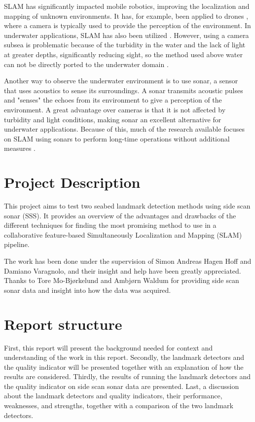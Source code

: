 SLAM has significantly impacted mobile robotics, improving the localization and mapping of unknown environments. It has, for example, been applied to drones \cite{VonStumberg2017FromExploration}, where a camera is typically used to provide the perception of the environment. In underwater applications, SLAM has also been utilized \cite{Hidalgo2015ReviewTechniques}. However, using a camera subsea is problematic because of the turbidity in the water and the lack of light at greater depths, significantly reducing sight, so the method used above water can not be directly ported to the underwater domain \cite{Paull2015Communication-constrainedSLAM}.  

Another way to observe the underwater environment is to use sonar, a sensor that uses acoustics to sense its surroundings. A sonar transmits acoustic pulses and "senses" the echoes from its environment to give a perception of the environment. A great advantage over cameras is that it is not affected by turbidity and light conditions, making sonar an excellent alternative for underwater applications. Because of this, much of the research available focuses on SLAM using sonars to perform long-time operations without additional measures \cite{Hidalgo2015ReviewTechniques}.

\section{Project Description}

This project aims to test two seabed landmark detection methods using side scan sonar (SSS). It provides an overview of the advantages and drawbacks of the different techniques for finding the most promising method to use in a collaborative feature-based Simultaneously Localization and Mapping (SLAM) pipeline.

The work has been done under the supervision of Simon Andreas Hagen Hoff and Damiano Varagnolo, and their insight and help have been greatly appreciated. Thanks to Tore Mo-Bjørkelund and Ambjørn Waldum for providing side scan sonar data and insight into how the data was acquired. 

\section{Report structure}

First, this report will present the background needed for context and understanding of the work in this report. Secondly, the landmark detectors and the quality indicator will be presented together with an explanation of how the results are considered. Thirdly, the results of running the landmark detectors and the quality indicator on side scan sonar data are presented. Last, a discussion about the landmark detectors and quality indicators, their performance, weaknesses, and strengths, together with a comparison of the two landmark detectors.  


